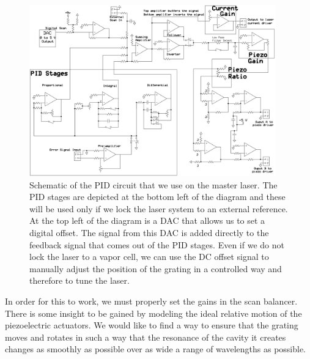 \begin{figure}
\centerline{
\includegraphics[width=0.95\textwidth]{PIDfromCJEdiss}}
\caption[Schematic of PID circuit]{\label{circuit} Schematic of the PID circuit that we use on the master laser. The PID stages are depicted at the bottom left of the diagram and these will be used only if we lock the laser system to an external reference. At the top left of the diagram is a DAC that allows us to set a digital offset. The signal from this DAC is added directly to the feedback signal that comes out of the PID stages. Even if we do not lock the laser to a vapor cell, we can use the DC offset signal to manually adjust the position of the grating in a controlled way and therefore to tune the laser.}
\end{figure}


In order for this to work, we must properly set the gains in the scan balancer. There is some insight to be gained by modeling the ideal relative motion of the piezoelectric actuators. We would like to find a way to ensure that the grating moves and rotates in such a way that the resonance of the cavity it creates changes as smoothly as possible over as wide a range of wavelengths as possible. 

